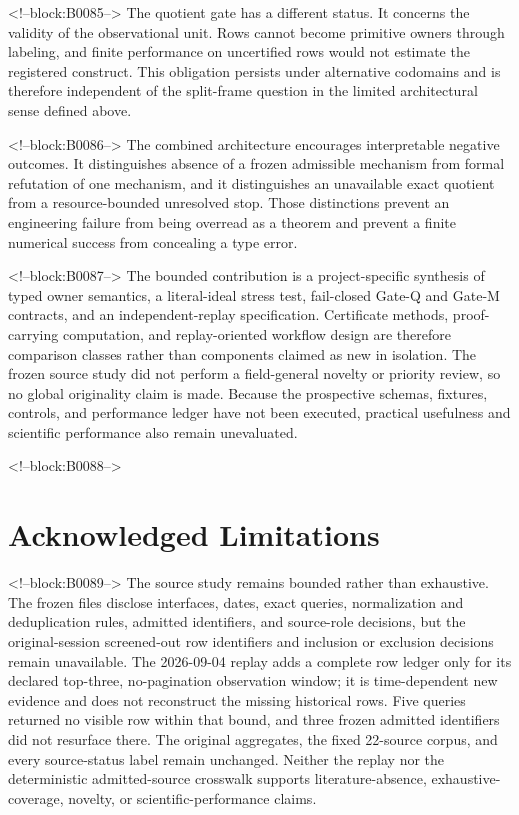 \documentclass[11pt,a4paper]{article}
\begin{document}
<!--block:B0085-->
The quotient gate has a different status. It concerns the validity of the observational unit. Rows cannot become primitive owners through labeling, and finite performance on uncertified rows would not estimate the registered construct. This obligation persists under alternative codomains and is therefore independent of the split-frame question in the limited architectural sense defined above.

<!--block:B0086-->
The combined architecture encourages interpretable negative outcomes. It distinguishes absence of a frozen admissible mechanism from formal refutation of one mechanism, and it distinguishes an unavailable exact quotient from a resource-bounded unresolved stop. Those distinctions prevent an engineering failure from being overread as a theorem and prevent a finite numerical success from concealing a type error.

<!--block:B0087-->
The bounded contribution is a project-specific synthesis of typed owner semantics, a literal-ideal stress test, fail-closed Gate-Q and Gate-M contracts, and an independent-replay specification. Certificate methods, proof-carrying computation, and replay-oriented workflow design are therefore comparison classes rather than components claimed as new in isolation. The frozen source study did not perform a field-general novelty or priority review, so no global originality claim is made. Because the prospective schemas, fixtures, controls, and performance ledger have not been executed, practical usefulness and scientific performance also remain unevaluated.

<!--block:B0088-->
\section{Acknowledged Limitations}

<!--block:B0089-->
The source study remains bounded rather than exhaustive. The frozen files disclose interfaces, dates, exact queries, normalization and deduplication rules, admitted identifiers, and source-role decisions, but the original-session screened-out row identifiers and inclusion or exclusion decisions remain unavailable. The 2026-09-04 replay adds a complete row ledger only for its declared top-three, no-pagination observation window; it is time-dependent new evidence and does not reconstruct the missing historical rows. Five queries returned no visible row within that bound, and three frozen admitted identifiers did not resurface there. The original aggregates, the fixed 22-source corpus, and every source-status label remain unchanged. Neither the replay nor the deterministic admitted-source crosswalk supports literature-absence, exhaustive-coverage, novelty, or scientific-performance claims.
\end{document}
